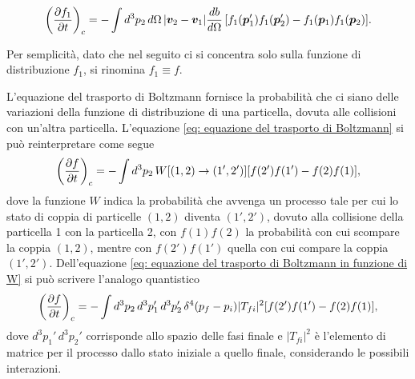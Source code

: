 \begin{equation}
\label{eq: equazione del trasporto di Boltzmann}
    \bigg(\frac{\partial f_1}{\partial t}\bigg)_c = -\int d^3p_2\,d\Omega\,|\bm{v}_2 - \bm{v}_1|\frac{db}{d\Omega}\,[f_1(\bm{p}_1')f_1(\bm{p}_2') - f_1(\bm{p}_1)f_1(\bm{p}_2)].
\end{equation}
\begin{notz}
    Per semplicità, dato che nel seguito ci si concentra solo sulla funzione di distribuzione $f_1$, si rinomina $f_1\equiv f$.
\end{notz}
L'equazione del trasporto di Boltzmann fornisce la probabilità che ci siano delle variazioni della funzione di distribuzione di una particella, dovuta alle collisioni con un'altra particella. L'equazione \eqref{eq: equazione del trasporto di Boltzmann} si può reinterpretare come segue
\begin{equation}
\label{eq: equazione del trasporto di Boltzmann in funzione di W}
    \bigg(\frac{\partial f}{\partial t}\bigg)_c = -\int d^3p_2\,W[(1,2)\to(1',2')][f(2')f(1') - f(2)f(1)],
\end{equation}
dove la funzione $W$ indica la probabilità che avvenga un processo tale per cui lo stato di coppia di particelle $(1,2)$ diventa $(1',2')$, dovuto alla collisione della particella 1 con la particella 2, con $f(1)f(2)$ la probabilità con cui scompare la coppia $(1,2)$, mentre con $f(2')f(1')$ quella con cui compare la coppia $(1',2')$. Dell'equazione \eqref{eq: equazione del trasporto di Boltzmann in funzione di W} si può scrivere l'analogo quantistico
\begin{equation}
\label{eq: equazione del trasporto di Boltzmann quatistica}
    \bigg(\frac{\partial f}{\partial t}\bigg)_c = -\int d^3p_2\,d^3p_1'\,d^3p_2'\,\delta^4(p_f - p_i)|T_{fi}|^2[f(2')f(1') - f(2)f(1)],
\end{equation}
dove $d^3p_1'\,d^3p_2'$ corrisponde allo spazio delle fasi finale e $|T_{fi}|^2$ è l'elemento di matrice per il processo dallo stato iniziale a quello finale, considerando le possibili interazioni. 

